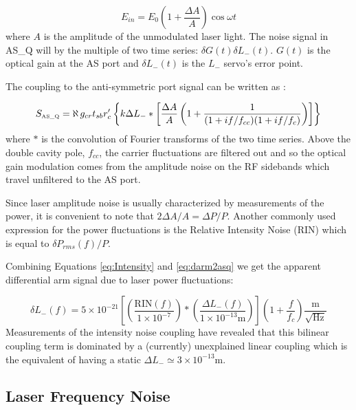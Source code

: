 \begin{equation}
E_{in} = E_{0} \left(1 + \frac{\Delta A}{A} \right) \cos{\omega t} 
\end{equation}
where $A$ is the amplitude of the unmodulated laser light. The noise signal
in AS\_Q will by the multiple of two time series: $\delta G(t) \delta L_{-}(t)$. $G(t)$
is the optical gain at the AS port and $\delta L_{-}(t)$ is the $L_{-}$ servo's error point.

The coupling to the anti-symmetric port signal can be written as \cite{Sigg:FreqResp}:

\begin{equation}
S_{\mbox{\tiny AS\_Q}} =
\aleph \, g_{cr} t_{sb} r_{c}' 
\left\{k \Delta L_{-} * 
\left[\frac{\Delta A}{A} 
\left(1 + \frac{1}{(1 + i f/f_{cc})(1 + i f/f_{c})}
\right) 
\right] 
\right\}
\label{eq:Intensity}
\end{equation}
where $*$ is the convolution of Fourier transforms of the two time series.
Above the double cavity pole, $f_{cc}$, the carrier fluctuations are filtered out
and so the optical gain modulation  comes from the amplitude noise on the RF sidebands which
travel unfiltered to the AS port.

Since laser amplitude noise is usually characterized by measurements of the power,
it is convenient to note that $2 \Delta A/A = \Delta P/P$. Another commonly
used expression for the power fluctuations is the Relative Intensity Noise (RIN)
which is equal to $\delta P_{rms}(f)/ P$.

Combining Equations \ref{eq:Intensity} and \ref{eq:darm2asq} we get
the apparent differential arm signal due to laser power fluctuations:

\begin{equation}
\delta L_{-}(f) = 5 \times 10^{-21} 
               \left[\left(\frac{\mbox{RIN}(f)}{1 \times 10^{-7}}\right) *
               \left(\frac{\Delta L_{-}(f)}{1 \times 10^{-13} \mbox{m}}\right)\right]
               \left(1 + \frac{f}{f_c}\right) \frac{\mbox{m}}{\sqrt{\mbox{Hz}}}
\end{equation}
Measurements of the intensity noise coupling have revealed that this bilinear
coupling term is dominated by a (currently) unexplained linear coupling which
is the equivalent of having a static $\Delta L_- \simeq 3 \times 10^{-13} \mbox{m}$.


\subsection{Laser Frequency Noise}
\label{sec:FreqNoise}

